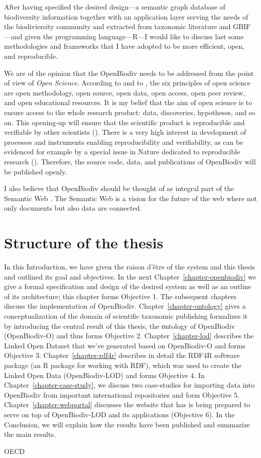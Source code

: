 After having specified the desired design---a semantic graph database of biodiversity information together with an application layer serving the needs of the biodiviersity community and extracted from taxonomic literature and GBIF---and given the programming language---R---I would like to discuss last some methodologies and frameworks that I have adopted to be more efficient, open, and reproducible.

We are of the opinion that the OpenBiodiv needs to be addressed from the point of view of \emph{Open Science}. According to \cite{kraker_case_2011} and to \cite{noauthor_was_nodate}, the six principles of open science are open methodology, open source, open data, open access, open peer review, and open educational resources. It is my belief that the aim of open science is to ensure access to the whole research product: data, discoveries, hypotheses, and so on. This opening-up will ensure that the scientific product is reproducible and verifiable by other scientists (\cite{mietchen_transformative_2014}). There is a very high interest in development of processes and instruments enabling reproducibility and verifiability, as can be evidenced for example by a special issue in Nature dedicated to reproducible research (\cite{noauthor_challenges_2010}). Therefore, the source code, data, and publications of OpenBiodiv will be published openly.

I also believe that OpenBiodiv should be thought of as integral part of the Semantic Web \cite{berners-lee_semantic_2001}. The Semantic Web is a vision for the future of the web where not only documents but also data are connected.

\section*{Structure of the thesis}

In this Introduction, we have given the raison d'\^etre of the system and this thesis and outlined its goal and objectives.
In the next Chapter~\ref{chapter-openbiodiv} we give a formal specification and design of the desired system as well as an outline of its architecture; this chapter forms Objective 1. The subsequent chapters discuss the implementation of OpenBiodiv. Chapter~\ref{chapter-ontology} gives a conceptualization of the domain of scientific taxonomic publishing formalizes it by introducing the central result of this thesis, the оntology of OpenBiodiv (OpenBiodiv-O) and thus forms Objective 2. Chapter~\ref{chapter-lod} describes the Linked Open Dataset that we've generated based on OpenBiodiv-O and forms Objective 3. Chapter~\ref{chapter-rdf4r} describes in detail the RDF4R software package (an R package for working with RDF), which was used to create the Linked Open Data (OpenBiodiv-LOD) and forms Objective 4. In Chapter~\ref{chapter-case-study}, we discuss two case-studies for importing data into OpenBiodiv from important international repositories and form Objective 5. Chapter~\ref{chapter-webportal} discusses the website that has is being prepared to serve on top of OpenBiodiv-LOD and its applications (Objective 6).
In the Conclusion, we will explain how the results have been published and summarize the main results.







OECD